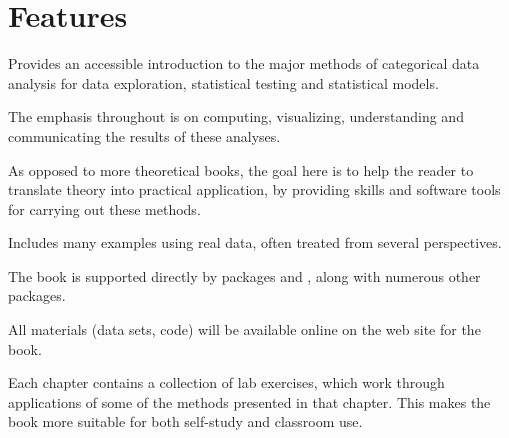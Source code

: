 \section*{Features}
\begin{itemize*}
	\item Provides an accessible introduction to the major methods of categorical data analysis
    for data exploration, statistical testing and statistical models.
	\item The emphasis throughout is on computing, visualizing, understanding and communicating
	  the results of these analyses.
  \item As opposed to more theoretical books, the goal here is to
    help the reader to translate theory into practical application, by providing skills and
    software tools for carrying out these methods.
	\item Includes many examples using real data, often treated from several perspectives.
	\item The book is supported directly by \R packages  and , along with numerous other \R packages.
	\item All materials (data sets, \R code) will be available online on the web site for the book.
  \item Each chapter contains a collection of lab exercises, which work through
    applications of some of the methods presented in that chapter.  This makes the book more suitable
    for both self-study and classroom use.
\end{itemize*}
